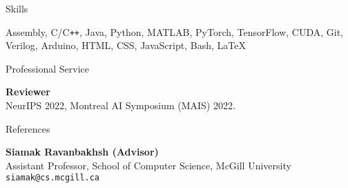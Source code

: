 \documentclass{resume}
\newcommand{\InternalSpace}{\vspace{0.18cm}}
\newenvironment{MySection}[1]
{\begin{category}{#1}}
{\end{category}}
\newcommand{\MyItem}{\citembullet}
\begin{document}





\begin{MySection}{Skills}

\MyItem 
Assembly, C/C\texttt{++}, Java, Python, MATLAB, PyTorch, TensorFlow, CUDA, Git, Verilog, Arduino, HTML, CSS, JavaScript, Bash, \LaTeX

\end{MySection}

\InternalSpace



\begin{MySection}{Professional Service}

\MyItem \textbf{Reviewer} \\ NeurIPS 2022, Montreal AI Symposium (MAIS) 2022.

\end{MySection}

\InternalSpace



\begin{MySection}{References}

\MyItem \textbf{Siamak Ravanbakhsh (Advisor)}\\
Assistant Professor, School of Computer Science, McGill University\\
\texttt{siamak@cs.mcgill.ca}

\end{MySection}

\InternalSpace










\end{document}
